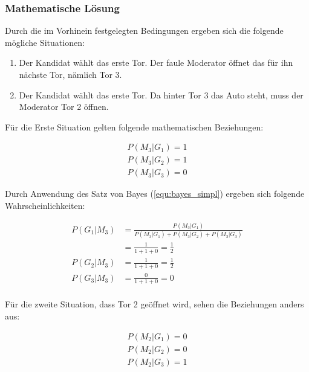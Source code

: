 \subsubsection{Mathematische Lösung}

Durch die im Vorhinein festgelegten Bedingungen ergeben sich die folgende mögliche Situationen:
\begin{enumerate}
    \item Der Kandidat wählt das erste Tor. Der faule Moderator öffnet das für ihn nächste Tor, nämlich Tor 3.
    \item Der Kandidat wählt das erste Tor. Da hinter Tor 3 das Auto steht, muss der Moderator Tor 2 öffnen.
\end{enumerate}

Für die Erste Situation gelten folgende mathematischen Beziehungen:

\begin{equation}
    \begin{split}
        P(M_3 | G_1) = 1 \\
        P(M_3 | G_2) = 1 \\
        P(M_3 | G_3) = 0
    \end{split}
\end{equation}

Durch Anwendung des Satz von Bayes (\autoref{equ:bayes_simpl}) ergeben sich folgende Wahrscheinlichkeiten:

\begin{equation}
    \begin{split}
        P(G_1 | M_3) & = \frac{P(M_3 | G_1)}{P(M_3 | G_1) +
            P(M_3 | G_2) + P(M_3 | G_3)} \\
        & = \frac{1}{1+1+0} = \frac{1}{2} \\
        P(G_2 | M_3) & =  \frac{1}{1+1+0} = \frac{1}{2} \\
        P(G_3 | M_3) & =  \frac{0}{1+1+0} = 0 \\
    \end{split}
\end{equation}

Für die zweite Situation, dass Tor 2 geöffnet wird, sehen die Beziehungen anders aus:

\begin{equation}
    \begin{split}
        P(M_2 | G_1) = 0 \\
        P(M_2 | G_2) = 0 \\
        P(M_2 | G_3) = 1
    \end{split}
\end{equation}

